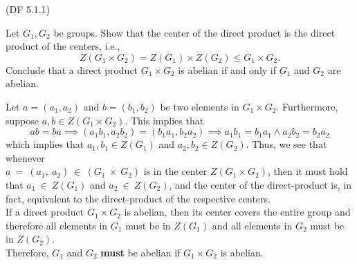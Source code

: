 \begin{problem}{(\textsf{DF 5.1.1})}

  \noindent
  Let $G_1,G_2$ be groups.
  Show that the center of the direct product is the direct product of the centers,
  i.e.,
  \[ Z(G_1 \times G_2) = Z(G_1) \times Z(G_2) \leq G_1 \times G_2. \]
  Conclude that a direct product $G_1 \times G_2$ is abelian
  if and only if $G_1$ and $G_2$ are abelian.
\end{problem}
\begin{Answer}
  Let $a = (a_1, a_2)$ and $b = (b_1, b_2)$ be two elements in $G_1 \times G_2$.
  Furthermore, suppose $a, b \in Z(G_1 \times G_2)$. This implies that
  \[
    ab = ba
    \implies (a_1 b_1, a_2 b_2) = (b_1 a_1, b_2 a_2) 
    \implies a_1 b_1 = b_1 a_1 \land a_2 b_2 = b_2 a_2
  \]
  which implies that $a_1, b_1 \in Z(G_1)$ and $a_2, b_2 \in Z(G_2)$.
  Thus, we see that whenever \\ $a~=~(a_1,~a_2)~\in~(G_1~\times~G_2)$
  is in the center $Z(G_1 \times G_2)$, then it must hold that
  $a_1~\in~Z(G_1)$ and $a_2~\in~Z(G_2)$,
  and the center of the direct-product is, in fact,
  equivalent to the direct-product of the respective centers. \\
  If a direct product $G_1 \times G_2$ is abelian,
  then its center covers the entire group and therefore
  all elements in $G_1$ must be in $Z(G_1)$ and
  all elements in $G_2$ must be in $Z(G_2)$. \\
  Therefore, $G_1$ and $G_2$ \textbf{must} be abelian if $G_1 \times G_2$ is abelian.
\end{Answer}
